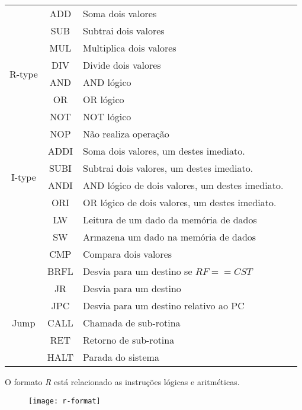 \begin{center}
\begin{longtable}[pos]{| c | c | l | m{7cm} |}
			\multirow{8}{*}{R-type} & ADD & Soma dois valores \\ \cline{2-3}	
	& SUB & Subtrai dois valores \\ \cline{2-3}	
	& MUL & Multiplica dois valores \\ \cline{2-3}	
	& DIV & Divide dois valores \\ \cline{2-3}
	& AND & AND lógico \\ \cline{2-3}
	& OR & OR lógico  \\ \cline{2-3}
	& NOT & NOT lógico \\ \cline{2-3}
	& NOP & Não realiza operação \\ \hline
	\multirow{4}{*}{I-type} & ADDI & Soma dois valores, um destes imediato. \\ \cline{2-3}
	& SUBI & Subtrai dois valores, um destes imediato. \\ \cline{2-3}
	& ANDI & AND lógico de dois valores, um destes imediato. \\ \cline{2-3}
	& ORI & OR lógico de dois valores, um destes imediato. \\ \cline{2-3}
	& LW & Leitura de um dado da memória de dados \\ \cline{2-3}
	& SW & Armazena um dado na memória de dados \\ \cline {2-3}
	& CMP & Compara dois valores \\ \cline {2-3}
	& BRFL & Desvia para um destino se $RF==CST$ \\ \hline
	\multirow{6}{*}{Jump} & JR & Desvia para um destino \\ \cline{2-3}
	& JPC & Desvia para um destino relativo ao PC \\ \cline{2-3}
	& CALL & Chamada de sub-rotina \\ \cline{2-3}
	& RET & Retorno de sub-rotina \\ \cline{2-3}
	& HALT & Parada do sistema \\ \hline

\end{longtable}
\end{center}

	O formato \textit{R} está relacionado as instruções lógicas e aritméticas.
	\begin{figure}[H]
    	\centering
    	\texttt{[image: r-format]}
	\end{figure}
	
